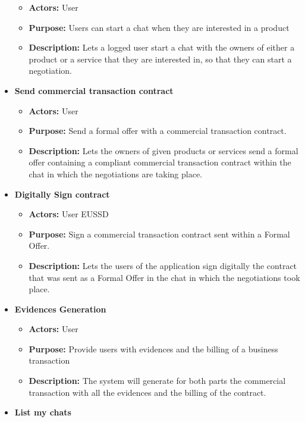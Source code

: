 \documentclass[./main.tex]{subfiles}
\begin{document}
\begin{itemize}
  \begin{itemize}
  
  \item
    \textbf{Actors:} User
  \item
    \textbf{Purpose:} Users can start a chat when they are interested in
    a product
  \item
    \textbf{Description:} Lets a logged user start a chat with the
    owners of either a product or a service that they are interested in,
    so that they can start a negotiation.
  \end{itemize}
\item
  \textbf{Send commercial transaction contract}

  \begin{itemize}
  
  \item
    \textbf{Actors:} User
  \item
    \textbf{Purpose:} Send a formal offer with a commercial transaction
    contract.
  \item
    \textbf{Description:} Lets the owners of given products or services
    send a formal offer containing a compliant commercial transaction
    contract within the chat in which the negotiations are taking place.
  \end{itemize}
\item
  \textbf{Digitally Sign contract}

  \begin{itemize}
  
  \item
    \textbf{Actors:} User EUSSD
  \item
    \textbf{Purpose:} Sign a commercial transaction contract sent within
    a Formal Offer.
  \item
    \textbf{Description:} Lets the users of the application sign
    digitally the contract that was sent as a Formal Offer in the chat
    in which the negotiations took place.
  \end{itemize}
\item
  \textbf{Evidences Generation}

  \begin{itemize}
  
  \item
    \textbf{Actors:} User
  \item
    \textbf{Purpose:} Provide users with evidences and the billing of a
    business transaction
  \item
    \textbf{Description:} The system will generate for both parts the
    commercial transaction with all the evidences and the billing of
    the contract.
  \end{itemize}
\item
\textbf{List my chats}


\end{itemize}
\end{document}
